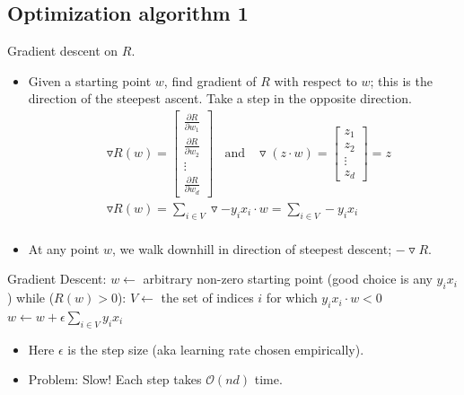 \documentclass[10pt]{article}
\begin{document}
	\subsection*{Optimization algorithm 1} Gradient descent on $R$.
		\begin{itemize}
			\item Given a starting point $w$, find gradient of $R$ with respect to $w$; this is the direction of the steepest ascent. Take a step in the opposite direction.
				\begin{align*}
					& \triangledown R(w) =
						\begin{bmatrix}
 							\frac{\partial R}{\partial w_{1}}\\
 							\frac{\partial R}{\partial w_{2}} \\
 							\vdots \\
 							\frac{\partial R}{\partial w_{d}}
 						\end{bmatrix}
 					\ \ \ \ \text{and} \ \ \ \
 					\triangledown(z \cdot w) =
						\begin{bmatrix}
 							z_{1} \\
 							z_{2} \\
 							\vdots \\
 							z_{d}
 						\end{bmatrix} = z\\
 					& \triangledown R(w) = \sum_{i \in V} \triangledown -y_{i}x_{i} \cdot w = \sum_{i \in V} -y_{i}x_{i}\\
				\end{align*}
			\item At any point $w$, we walk downhill in direction of steepest descent; $- \triangledown R$.
			\end{itemize}
\begin{codeblock}
	Gradient Descent:
	    $w \leftarrow$ arbitrary non-zero starting point (good choice is any $y_{i}x_{i}$)
	    while ($R(w) > 0$):
	        $V \leftarrow$ the set of indices $i$ for which $y_{i}x_{i} \cdot w < 0$
	        $w \leftarrow w + \epsilon \sum_{i \in V} y_{i}x_{i}$
\end{codeblock}
			\begin{itemize}
			\item Here $\epsilon$ is the step size (aka learning rate chosen empirically).
			
			\item Problem: Slow! Each step takes $\mathcal{O}(nd)$ time.
		\end{itemize}
	
\end{document}
